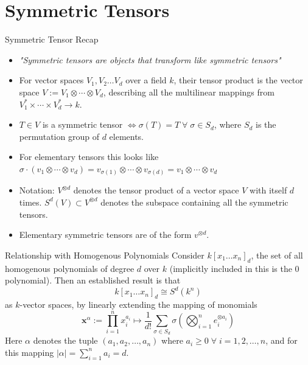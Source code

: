 \documentclass{beamer}
\begin{document}
\section{Symmetric Tensors}
\begin{frame}{Symmetric Tensor Recap}
    \begin{itemize}
        \item<1-> \textit{"Symmetric tensors are objects that transform like symmetric tensors"}
        \item<2-> For vector spaces $V_1, V_2 \ldots V_d$ over a field $k$, their tensor product is the vector space $V:= V_1 \otimes \cdots \otimes V_d$, describing all the multilinear mappings from $V_1^* \times \cdots \times V_d^* \to k$. \cite{landsberg_tensors_2012}
        \item<3->  $T \in V$ is a symmetric tensor $\iff \sigma(T) = T \;\forall\; \sigma \in S_d$, where $S_d$ is the permutation group of $d$ elements. \cite{comon_symmetric_2008}
        \item<3-> For elementary tensors this looks like $\sigma \cdot (v_1 \otimes \cdots \otimes v_d) = v_{\sigma(1)} \otimes \cdots \otimes v_{\sigma(d)} = v_1 \otimes \cdots \otimes v_d$
        \item<4-> Notation: $V^{\otimes d}$ denotes the tensor product of a vector space $V$ with itself $d$ times. $S^d(V) \subset V^{\otimes d}$ denotes the subspace containing all the symmetric tensors.
        \item<5-> Elementary symmetric tensors are of the form $v^{\otimes d}$.
    \end{itemize}
\end{frame} 
\begin{frame}{Relationship with Homogenous Polynomials}
    Consider $k[x_1 \ldots x_n]_d$, the set of all homogenous polynomials of degree $d$ over $k$ (implicitly included in this is the $0$ polynomial). Then an established result \cite{comon_symmetric_2008} is that $$k[x_1 \ldots x_n]_d \cong S^d(k^n)$$as $k$-vector spaces, by linearly extending the mapping of monomials $$\mathbf{x}^{\alpha}:= \prod_{i=1}^n x_i^{a_i} \mapsto \frac{1}{d!} \sum_{\sigma \in S_d} \sigma(\bigotimes_{i=1}^n e_i^{\otimes a_i}) $$
    Here $\alpha$ denotes the tuple $(a_1, a_2, \ldots, a_n)$ where $a_i \geq 0 \;\forall\; i = 1, 2,\ldots,n$, and for this mapping $|\alpha| = \sum_{i=1}^{n} a_i = d$.
\end{frame} 
\end{document}
